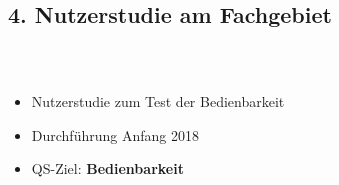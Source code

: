 \documentclass[accentcolor=tud1b,colorbacktitle,landscape,german,presentation]{tudbeamer}
\newcommand{\ftitle}{
	\frametitle{\insertsectionhead \\ {\small \insertsubsectionhead}}
}
\begin{document}
\subsection{4. Nutzerstudie am Fachgebiet}
\begin{frame}
	\ftitle
	\centering
	\vspace{-1.2cm}
	\vspace{-4.5cm}
	\begin{itemize}
		\item Nutzerstudie zum Test der Bedienbarkeit\pause
		\item Durchführung Anfang 2018\pause
		\item QS-Ziel: \textbf{Bedienbarkeit}
	\end{itemize}
\end{frame}
\end{document}
